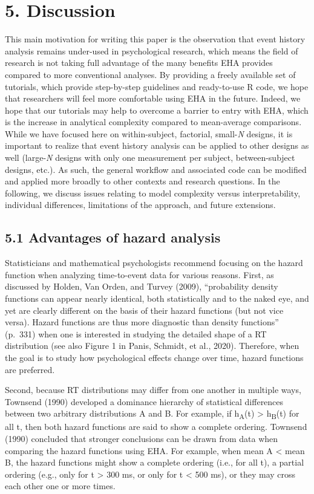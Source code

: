 \documentclass[
  man,floatsintext]{apa6}
\begin{document}
\section{5. Discussion}\label{discussion}

This main motivation for writing this paper is the observation that event history analysis remains under-used in psychological research, which means the field of research is not taking full advantage of the many benefits EHA provides compared to more conventional analyses. By providing a freely available set of tutorials, which provide step-by-step guidelines and ready-to-use R code, we hope that researchers will feel more comfortable using EHA in the future. Indeed, we hope that our tutorials may help to overcome a barrier to entry with EHA, which is the increase in analytical complexity compared to mean-average comparisons. While we have focused here on within-subject, factorial, small-\emph{N} designs, it is important to realize that event history analysis can be applied to other designs as well (large-\emph{N} designs with only one measurement per subject, between-subject designs, etc.). As such, the general workflow and associated code can be modified and applied more broadly to other contexts and research questions. In the following, we discuss issues relating to model complexity versus interpretability, individual differences, limitations of the approach, and future extensions.

\subsection{5.1 Advantages of hazard analysis}\label{advantages-of-hazard-analysis}

Statisticians and mathematical psychologists recommend focusing on the hazard function when analyzing time-to-event data for various reasons. First, as discussed by Holden, Van Orden, and Turvey (2009), ``probability density functions can appear nearly identical, both statistically and to the naked eye, and yet are clearly different on the basis of their hazard functions (but not vice versa). Hazard functions are thus more diagnostic than density functions'' (p.~331) when one is interested in studying the detailed shape of a RT distribution (see also Figure 1 in Panis, Schmidt, et al., 2020). Therefore, when the goal is to study how psychological effects change over time, hazard functions are preferred.

Second, because RT distributions may differ from one another in multiple ways, Townsend (1990) developed a dominance hierarchy of statistical differences between two arbitrary distributions A and B. For example, if h\textsubscript{A}(t) \textgreater{} h\textsubscript{B}(t) for all t, then both hazard functions are said to show a complete ordering. Townsend (1990) concluded that stronger conclusions can be drawn from data when comparing the hazard functions using EHA. For example, when mean A \textless{} mean B, the hazard functions might show a complete ordering (i.e., for all t), a partial ordering (e.g., only for t \textgreater{} 300 ms, or only for t \textless{} 500 ms), or they may cross each other one or more times.
\end{document}
